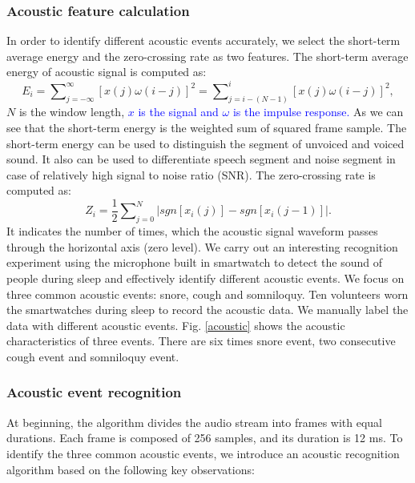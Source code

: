 \subsubsection*{Acoustic feature calculation}
In order to identify different acoustic events accurately, we select the short-term average energy and the zero-crossing rate as two features. The short-term average energy of acoustic signal is computed as:
\begin{equation}
  E_i=\sum\nolimits_{j=-\infty}^{\infty}[x(j)\omega(i-j)]^2=\sum\nolimits_{j=i-(N-1)}^{i}[x(j)\omega(i-j)]^2,
\end{equation}
$N$ is the window length, \textcolor{blue}{$x$ is the signal and $\omega$ is the impulse response.} As we can see that the short-term energy is the weighted sum of squared frame sample. The short-term energy can be used to distinguish the segment of unvoiced and voiced sound. It also can be used to differentiate speech segment and noise segment  in  case of relatively high signal to noise ratio (SNR). The zero-crossing rate is computed as:
\begin{equation}
  Z_i = \frac{1}{2}\sum\nolimits_{j=0}^{N}|sgn[x_i(j)]-sgn[x_i(j-1)]|.
\end{equation}
It indicates the number of times, which the acoustic signal waveform passes through the horizontal axis (zero level). We carry out an interesting recognition experiment using the microphone built in smartwatch to detect the sound of people during sleep and effectively identify different acoustic events. We focus on three common acoustic events: snore, cough and somniloquy. Ten volunteers worn the smartwatches during sleep to record the acoustic data. We manually label the data with different acoustic events. Fig. \ref{acoustic} shows the acoustic characteristics of  three events. There are six times snore event, two consecutive cough event and somniloquy event.


\subsubsection*{Acoustic event recognition}
 At beginning, the algorithm  divides the audio stream into frames with equal durations. Each frame is composed of 256 samples, and its duration is 12 ms. To identify the  three common acoustic events, we introduce an acoustic recognition algorithm based on the following key observations:

